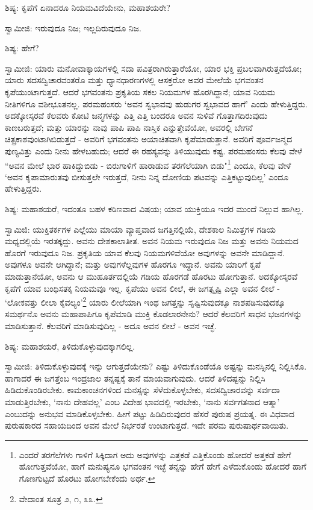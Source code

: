 ಶಿಷ್ಯ: ಕೃಪೆಗೆ ಏನಾದರೂ ನಿಯಮವಿದೆಯೇನು, ಮಹಾಶಯರೇ?

ಸ್ವಾಮೀಜಿ: ಇರುವುದೂ ನಿಜ; ಇಲ್ಲದಿರುವುದೂ ನಿಜ.

ಶಿಷ್ಯ: ಹೇಗೆ?

ಸ್ವಾಮೀಜಿ: ಯಾರು ಮನೋವಾಕ್ಕಾಯಗಳಲ್ಲಿ ಸದಾ ಪವಿತ್ರರಾಗಿರುತ್ತಾರೆಯೋ, ಯಾರ ಭಕ್ತಿ ಪ್ರಬಲವಾಗಿರುತ್ತದೆಯೋ; ಯಾರು ಸದಸದ್ವಿಚಾರವಂತರೊ ಮತ್ತು ಧ್ಯಾನಧಾರಣಗಳಲ್ಲಿ ಆಸಕ್ತರೋ ಅವರ ಮೇಲೆಯೆ ಭಗವಂತನ ಕೃಪೆಯುಂಟಾಗುತ್ತದೆ. ಆದರೆ ಭಗವಂತನು ಪ್ರಕೃತಿಯ ಸಕಲ ನಿಯಮಗಳ ಹೊರಗಿದ್ದಾನೆ; ಯಾವ ನಿಯಮ ನೀತಿಗಳಿಗೂ ವಶೀಭೂತನಲ್ಲ. ಪರಮಹಂಸರು ‘ಅವನ ಸ್ವಭಾವವು ಹುಡುಗರ ಸ್ವಭಾವದ ಹಾಗೆ’ ಎಂದು ಹೇಳುತ್ತಿದ್ದರು. ಅದಕ್ಕೋಸ್ಕರವೆ ಕೆಲವರು ಕೋಟಿ ಜನ್ಮಗಳನ್ನು ಎತ್ತಿ ಎತ್ತಿ ಬಂದರೂ ಅವನ ಸುಳಿವೆ ಗೊತ್ತಾಗದಿರುವುದು ಕಾಣಬರುತ್ತದೆ; ಮತ್ತು ಯಾರನ್ನು ನಾವು ಪಾಪಿ ಪಾಪಿ ನಾಸ್ತಿಕ ಎನ್ನುತ್ತೇವೆಯೋ, ಅವರಲ್ಲಿ ಬೇಗನೆ ಚಿತ್ಪ್ರಕಾಶವುಂಟಾಗಿಬಿಡುತ್ತದೆ - ಅವರಿಗೆ ಭಗವಂತನು ಅಯಾಚಿತವಾಗಿ ಕೃಪೆಮಾಡುತ್ತಾನೆ. ಅವರಿಗೆ ಪೂರ್ವಜನ್ಮದ ಪುಣ್ಯವಿತ್ತು ಎಂದು ನೀನು ಹೇಳಬಹುದು; ಆದರೆ ಈ ರಹಸ್ಯವನ್ನು ತಿಳಿಯುವುದು ಕಷ್ಟ. ಪರಮಹಂಸರು ಕೆಲವು ವೇಳೆ “ಅವನ ಮೇಲೆ ಭಾರ ಹಾಕಿದ್ದುಬಿಡು - ಬಿರುಗಾಳಿಗೆ ಹಾರಾಡುವ ತರಗೆಲೆಯಾಗಿ ಬಿಡು"\footnote{ಎಂದರೆ ತರಗೆಲೆಗಳು ಗಾಳಿಗೆ ಸಿಕ್ಕಿದಾಗ ಅದು ಅವುಗಳನ್ನು ಎತ್ತಕಡೆ ಎತ್ತಿಕೊಂಡು ಹೋದರೆ ಅತ್ತಕಡೆ ಹೇಗೆ ಹೋಗುತ್ತವೆಯೋ, ಹಾಗೆ ಮನುಷ್ಯನೂ ಭಗವಂತನ ಇಚ್ಛೆ ತನ್ನನ್ನು ಹೇಗೆ ಹೇಗೆ ಎಳೆದುಕೊಂಡು ಹೋದರೆ ಹಾಗೆ ಗೊಣಗುಟ್ಟದೆ ಹೊರಟು ಹೋಗಬೇಕೆಂದು ಅರ್ಥ.} ಎಂದೂ, ಕೆಲವು ವೇಳೆ ‘ಅವನ ಕೃಪಾಮಾರುತವು ಬೀಸುತ್ತಲೇ ಇರುತ್ತದೆ, ನೀನು ನಿನ್ನ ದೋಣಿಯ ಪಟವನ್ನು ಎತ್ತಿಕಟ್ಟುವುದಿಲ್ಲ’ ಎಂದೂ ಹೇಳುತ್ತಿದ್ದರು.

ಶಿಷ್ಯ: ಮಹಾಶಯರೆ, ಇದಂತೂ ಬಹಳ ಕಠಿಣವಾದ ವಿಷಯ; ಯಾವ ಯುಕ್ತಿಯೂ ಇದರ ಮುಂದೆ ನಿಲ್ಲುವ ಹಾಗಿಲ್ಲ.

ಸ್ವಾಮಿಜಿ: ಯುಕ್ತಿತರ್ಕಗಳ ಎಲ್ಲೆಯು ಮಾಯಾ ವ್ಯಾಪ್ತವಾದ ಜಗತ್ತಿನಲ್ಲಿಯೆ, ದೇಶಕಾಲ ನಿಮಿತ್ತಗಳ ಗಡಿಯ ಮಧ್ಯದಲ್ಲಿಯೆ ಇರತಕ್ಕದ್ದು. ಅವನು ದೇಶಕಾಲಾತೀತ. ಅವನ ನಿಯಮ ಇರುವುದೂ ನಿಜ ಮತ್ತು ಅವನು ನಿಯಮದ ಹೊರಗೆ ಇರುವುದೂ ನಿಜ. ಪ್ರಕೃತಿಯ ಯಾವ ಕೆಲವು ನಿಯಮಗಳಿವೆಯೋ ಅವುಗಳನ್ನು ಅವನೇ ಮಾಡಿದ್ದಾನೆ. ಅವುಗಳೂ ಅವನೇ ಆಗಿದ್ದಾನೆ; ಮತ್ತು ಅವುಗಳೆಲ್ಲವುಗಳ ಹೊರಗೂ ಇದ್ದಾನೆ. ಅವನು ಯಾರಿಗೆ ಕೃಪೆ ಮಾಡುತ್ತಾನೆಯೋ, ಅವನು ಆ ಮುಹೂರ್ತದಲ್ಲಿಯೆ ಗಡಿಯ ಹೊರಗಡೆ ಹೊರಟು ಹೋಗುತ್ತಾನೆ. ಅದಕ್ಕೋಸ್ಕರವೆ ಕೃಪೆಗೆ ಯಾವ ಬಂಧಿಸತಕ್ಕ ನಿಯಮವೂ ಇಲ್ಲ. ಕೃಪೆಯು ಅವನ ಲೀಲೆ, ಈ ಜಗತ್ಸೃಷ್ಟಿ ಎಲ್ಲಾ ಅವನ ಲೀಲೆ - ‘ಲೋಕವತ್ತು ಲೀಲಾ ಕೈವಲ್ಯಂ’\footnote{ವೇದಾಂತ ಸೂತ್ರ ೨, ೧, ೩೩.} ಯಾರು ಲೀಲೆಯಾಗಿ ಇಂಥ ಜಗತ್ತನ್ನು ಸೃಷ್ಟಿಸುವುದಕ್ಕೂ ನಾಶಪಡಿಸುವುದಕ್ಕೂ ಸಮರ್ಥನೊ ಅವನು ಮಹಾಪಾಪಿಗೂ ಕೃಪೆಮಾಡಿ ಮುಕ್ತಿ ಕೊಡಲಾರನೇನು? ಆದರೆ ಕೆಲವರಿಗೆ ಸಾಧನ ಭಜನಗಳನ್ನು ಮಾಡಿಸುತ್ತಾನೆ. ಕೆಲವರಿಗೆ ಮಾಡಿಸುವುದಿಲ್ಲ - ಅದೂ ಅವನ ಲೀಲೆ - ಅವನ ಇಚ್ಛೆ.

ಶಿಷ್ಯ: ಮಹಾಶಯರೆ, ತಿಳಿದುಕೊಳ್ಳುವುದಕ್ಕಾಗಲಿಲ್ಲ.

ಸ್ವಾಮೀಜಿ: ತಿಳಿದುಕೊಳ್ಳುವುದಕ್ಕೆ ಇನ್ನು ಆಗುತ್ತದೆಯೇನು? ಎಷ್ಟು ತಿಳಿದುಕೊಂಡೆಯೊ ಅಷ್ಟನ್ನು ಮನಸ್ಸಿನಲ್ಲಿ ನಿಲ್ಲಿಸಿಕೊ. ಹಾಗಾದರೆ ಈ ಜಗತ್ತೆಂಬ ಇಂದ್ರಜಾಲ ತನ್ನಷ್ಟಕ್ಕೆ ತಾನೆ ಮಾಯವಾಗುವುದು. ಆದರೆ ತಿಳಿದಷ್ಟನ್ನು ನಿಲ್ಲಿಸಿ ಹಿಡಿದುಕೊಂಡಿರಬೇಕು. ಕಾಮಕಾಂಚನಗಳಿಂದ ಮನಸ್ಸನ್ನು ಸೆಳೆದುಕೊಳ್ಳಬೇಕು, ಸದಸದ್ವಿಚಾರವನ್ನು ಸರ್ವದಾ ಮಾಡುತ್ತಿರಬೇಕು, ‘ನಾನು ದೇಹವಲ್ಲ’ ಎಂಬ ವಿದೇಹ ಭಾವದಲ್ಲಿ ಇರಬೇಕು, ‘ನಾನು ಸರ್ವಗತನಾದ ಆತ್ಮಾ’ ಎಂಬುದನ್ನು ಅನುಭವ ಮಾಡಿಕೊಳ್ಳಬೇಕು. ಹೀಗೆ ಪಟ್ಟು ಹಿಡಿದಿರುವುದರ ಹೆಸರೆ ಪುರುಷ ಪ್ರಯತ್ನ. ಈ ವಿಧವಾದ ಪುರುಷಕಾರದ ಸಹಾಯದಿಂದ ಅವನ ಮೇಲೆ ನಿರ್ಭರತೆ ಉಂಟಾಗುತ್ತದೆ. ಇದೇ ಪರಮ ಪುರುಷಾರ್ಥವಾಯಿತು.

